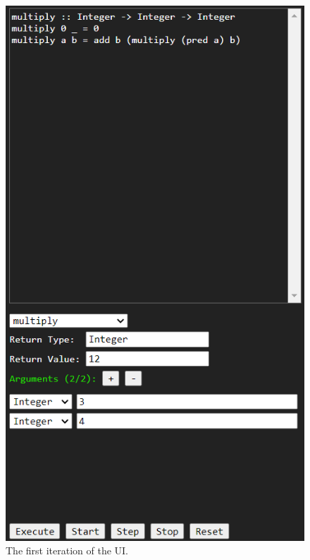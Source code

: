 \begin{figure}
    \centering
    \begin{minipage}[b]{0.45\textwidth}
        \includegraphics[width=\textwidth]{chapters/5-implementation/images/old.png}
        \caption{The first iteration of the UI.}
        \label{fig:old-ui}
    \end{minipage}
    \hfill
    \begin{minipage}[b]{0.45\textwidth}

\end{minipage}
\end{figure}
